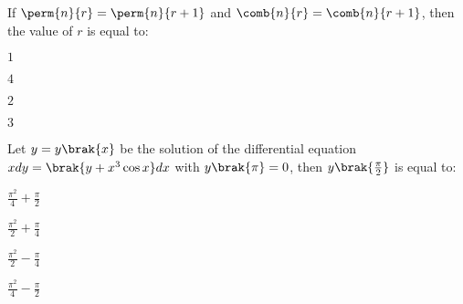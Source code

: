 \item If $\perm{n}{r}=\perm{n}{r+1}$ and $\comb{n}{r} = \comb{n}{r+1}$, then the value of $r$ is equal to:
\hfill{}
\begin{enumerate}
\begin{multicols}{4}
\item $1$
\item $4$
\item $2$
\item $3$
\end{multicols}
\end{enumerate}

\item Let $y=y\brak{x}$ be the solution of the differential equation $xdy=\brak{y+x^{3}\cos x}dx$ with $y\brak{\pi}=0$, then $y\brak{\frac{\pi}{2}}$ is equal to:

\hfill{}
\begin{enumerate}
\begin{multicols}{4}
\item $\frac{\pi^2}{4}+\frac{\pi}{2}$
\item $\frac{\pi^2}{2}+\frac{\pi}{4}$
\item $\frac{\pi^2}{2}-\frac{\pi}{4}$
\item $\frac{\pi^2}{4}-\frac{\pi}{2}$
\end{multicols}
\end{enumerate}

